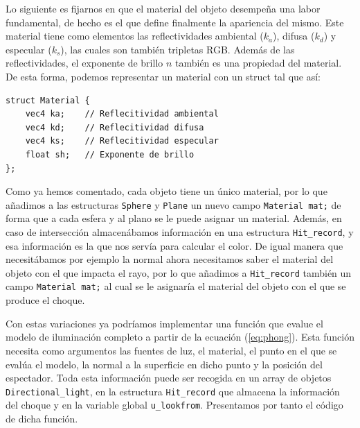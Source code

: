 Lo siguiente es fijarnos en que el material del objeto desempeña una labor fundamental, de hecho es el que define finalmente la apariencia del mismo. Este material tiene como elementos las reflectividades ambiental ($k_a$), difusa ($k_d$) y especular ($k_s$), las cuales son también tripletas RGB. Además de las reflectividades, el exponente de brillo $n$ también es una propiedad del material. De esta forma, podemos representar un material con un struct tal que así:

\begin{lstlisting}
struct Material {
    vec4 ka;    // Reflecitividad ambiental
    vec4 kd;    // Reflecitividad difusa
    vec4 ks;    // Reflecitividad especular
    float sh;   // Exponente de brillo
};
\end{lstlisting}

Como ya hemos comentado, cada objeto tiene un único material, por lo que añadimos a las estructuras \verb|Sphere| y \verb|Plane| un nuevo campo \verb|Material mat;| de forma que a cada esfera y al plano se le puede asignar un material. Además, en caso de intersección almacenábamos información en una estructura \verb|Hit_record|, y esa información es la que nos servía para calcular el color. De igual manera que necesitábamos por ejemplo la normal ahora necesitamos saber el material del objeto con el que impacta el rayo, por lo que añadimos a \verb|Hit_record| también un campo \verb|Material mat;| al cual se le asignaría el material del objeto con el que se produce el choque.

Con estas variaciones ya podríamos implementar una función que evalue el modelo de iluminación completo a partir de la ecuación (\ref{eq:phong}). Esta función necesita como argumentos las fuentes de luz, el material, el punto en el que se evalúa el modelo, la normal a la superficie en dicho punto y la posición del espectador. Toda esta información puede ser recogida en un array de objetos \verb|Directional_light|, en la estructura \verb|Hit_record| que almacena la información del choque y en la variable global \verb|u_lookfrom|. Presentamos por tanto el código de dicha función.

